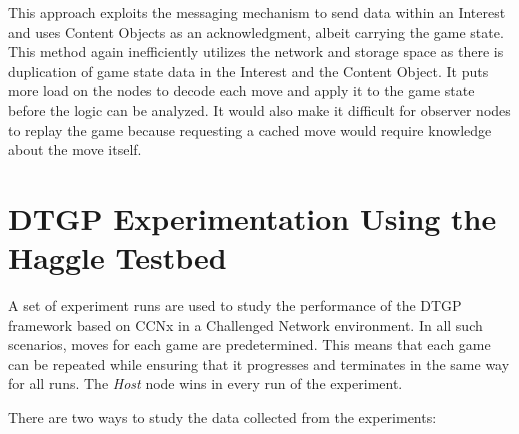 \documentclass[a4paper,12pt]{report}      %
\begin{document}
This approach exploits the messaging mechanism to send data within an Interest and uses Content Objects
as an acknowledgment, albeit carrying the game state. This method again inefficiently utilizes the network and storage space
 as there is duplication of game state data in the Interest and the Content Object. It puts more load on the nodes
to decode each move and apply it to the game state before the logic can be analyzed. It would also make it difficult
for observer nodes to replay the game because requesting a cached move would require knowledge about the move itself.

\pagebreak
\chapter{DTGP Experimentation Using the Haggle Testbed}

A set of experiment runs are used to study the performance of the DTGP framework based on CCNx in a Challenged Network environment.
In all such scenarios, moves for each game are predetermined. This means that each game can be repeated
 while ensuring that it progresses and terminates in the same way for all runs. The \emph{Host} node wins in every run of the experiment. 

\noindent There are two ways to study the data collected from the experiments:
\end{document}
